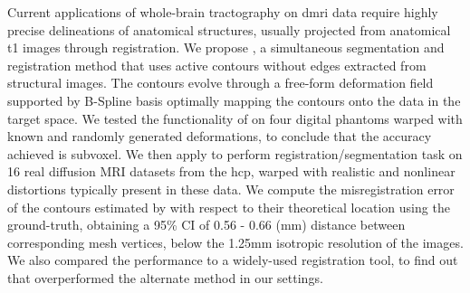 Current applications of whole-brain tractography on \acrlong*{dmri} data require highly precise
  delineations of anatomical structures, usually projected from anatomical \acrlong*{t1} images
  through registration.
We propose \regseg{}, a simultaneous segmentation and registration method
  that uses active contours without edges extracted from structural images.
The contours evolve through a free-form deformation field supported by B-Spline basis
  optimally mapping the contours onto the data in the target space.
We tested the functionality of \regseg{} on four digital phantoms warped with known and
  randomly generated deformations, to conclude that the accuracy achieved is subvoxel.
We then apply \regseg{} to perform registration/segmentation task on 16 real diffusion MRI
  datasets from the \acrlong*{hcp}, warped with realistic and nonlinear distortions typically
  present in these data.
We compute the misregistration error of the contours estimated by \regseg{} with respect
  to their theoretical location using the ground-truth, obtaining a 95\% CI of 0.56 - 0.66 (mm)
  distance between corresponding mesh vertices, below the 1.25mm isotropic resolution of the images.
We also compared the performance to a widely-used registration tool, to find out
  that \regseg{} overperformed the alternate method in our settings.
